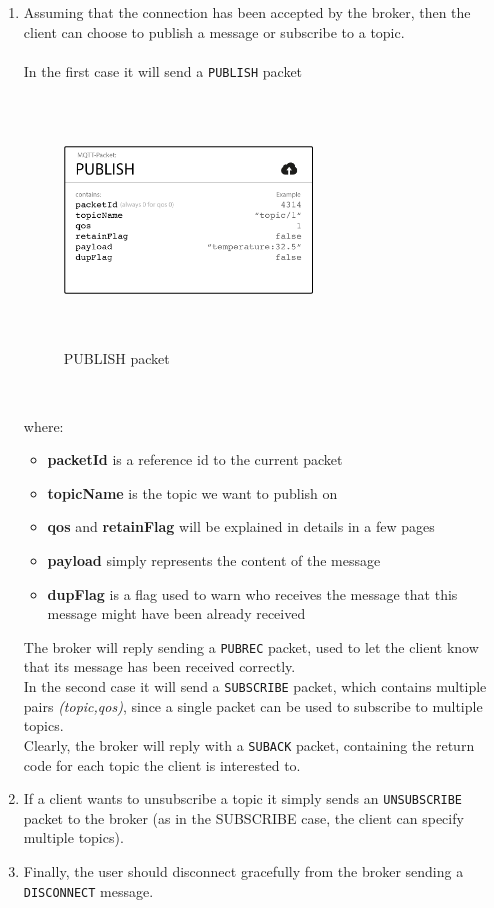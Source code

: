 \documentclass[12pt]{report}
\begin{document}
\begin{enumerate}
\item Assuming that the connection has been accepted by the broker, then the client can choose to publish a message or subscribe to a topic.\\\\
In the first case it will send a \texttt{PUBLISH} packet

\begin{figure}[H]
\includegraphics[width=6.6cm,height=6.6cm,keepaspectratio]{publish_message}
\centering
\caption{PUBLISH packet}
\end{figure}\

where:

\begin{itemize}
\setlength{\itemindent}{+4mm}
\item \textbf{packetId} is a reference id to the current packet
\item \textbf{topicName} is the topic we want to publish on
\item \textbf{qos} and \textbf{retainFlag} will be explained in details in a few pages
\item \textbf{payload} simply represents the content of the message
\item \textbf{dupFlag} is a flag used to warn who receives the message that this message might have been already received
\end{itemize}

The broker will reply sending a \texttt{PUBREC} packet, used to let the client know that its message has been received correctly.
\bigskip \\
In the second case it will send a \texttt{SUBSCRIBE} packet, which contains multiple pairs \textit{(topic,qos)}, since a single packet can be used to subscribe to multiple topics.\\
Clearly, the broker will reply with a \texttt{SUBACK} packet, containing the return code for each topic the client is interested to.

\item If a client wants to unsubscribe a topic it simply sends an \texttt{UNSUBSCRIBE}  packet to the broker (as in the SUBSCRIBE case, the client can specify multiple topics).

\item Finally, the user should disconnect gracefully from the broker sending a \texttt{DISCONNECT} message.\\\\\\

\end{enumerate}
\bigskip
\end{document}
